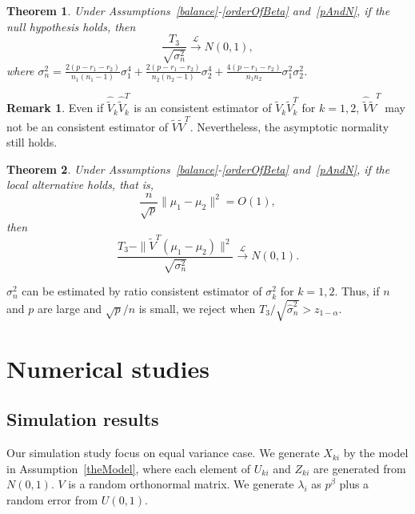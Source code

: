 \documentclass[review]{elsarticle}
\theoremstyle{plain}
\newtheorem{theorem}{\quad\quad Theorem}
\theoremstyle{definition}
\newtheorem{remark}{\quad\quad Remark}
\theoremstyle{remark}
\begin{document}
\begin{theorem}\label{myXiaopanpan}
    Under Assumptions~\ref{balance}-\ref{orderOfBeta} and~\ref{pAndN},
     if the null hypothesis holds, then 
\begin{equation*}
    \frac{T_3}{\sqrt{\sigma_n^2}}\xrightarrow{\mathcal{L}}N(0,1),
\end{equation*}
where
$\sigma_n^2=\frac{2(p-r_1-r_2)}{n_1(n_1-1)}\sigma_1^4+\frac{2(p-r_1-r_2)}{n_2(n_2-1)}\sigma_2^4+\frac{4(p-r_1-r_2)}{n_1n_2}\sigma_1^2\sigma_2^2$.
\end{theorem}
\begin{remark}
    Even if $\hat{\tilde{V}}_k\hat{\tilde{V}}_k^T$ is an consistent estimator of $\tilde{V}_k\tilde{V}_k^T$ for $k=1,2$, $\hat{\tilde{V}}\hat{\tilde{V}}^T$ may not be an consistent estimator of $\tilde{V}\tilde{V}^T$.
    Nevertheless, the asymptotic normality still holds.
\end{remark}
\begin{theorem}\label{myXiaopanpan2}
    Under Assumptions~\ref{balance}-\ref{orderOfBeta} and~\ref{pAndN},
 if the local alternative holds, that is,
    $$\frac{n}{\sqrt{p}}\|\mu_1-\mu_2\|^2=O(1),$$
then 
\begin{equation*}
        \frac{T_3-\|\tilde{V}^T(\mu_1-\mu_2)\|^2}{\sqrt{\sigma_n^2}}\xrightarrow{\mathcal{L}} N(0,1).
\end{equation*}
\end{theorem} 

 $\sigma_n^2$ can be estimated by ratio consistent estimator of $\sigma^2_k$ for $k=1,2$. Thus, if $n$ and $p$ are large and ${\sqrt{p}}/{n}$ is small, we reject when $T_3/\sqrt{\hat{\sigma}_n^2}>z_{1-\alpha}$. 




\section{Numerical studies}
\subsection{Simulation results}

Our simulation study focus on equal variance case. 
We generate $X_{ki}$ by the model in Assumption~\ref{theModel}, where each element of $U_{ki}$ and $Z_{ki}$ are generated from $N(0,1)$.
$V$ is a random orthonormal matrix. 
We generate $\lambda_i$ as $p^{\beta}$ plus a random error from $U(0,1)$.
\end{document}
